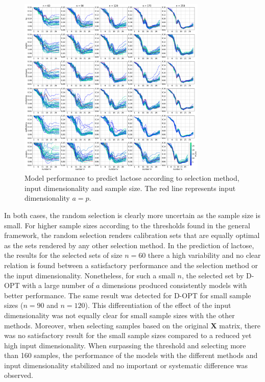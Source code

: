 \documentclass[journal=ancham,manuscript=article]{achemso}
\begin{document}
\begin{figure}[b]
\includegraphics[width=0.8\textwidth]{manuscript/figures/d01_milk_model_performance.png}
\centering
\caption{Model performance to predict lactose according to selection method, input dimensionality and sample size. The red line represents input dimensionality $a=p$.}
\label{fig_d01_milk_model_performance}
\end{figure}

In both cases, the random selection is clearly more uncertain as the sample size is small. For higher sample sizes according to the thresholds found in the general framework, the random selection renders calibration sets that are equally optimal as the sets rendered by any other selection method. In the prediction of lactose, the results for the selected sets of size $n=60$ there a high variability and no clear relation is found between a satisfactory performance and the selection method or the input dimensionality. Nonetheless, for such a small $n$, the selected set by D-OPT with a large number of $a$ dimensions produced consistently models with better performance. The same result was detected for D-OPT for small sample sizes ($n=90$ and $n=120$). This differentiation of the effect of the input dimensionality was not equally clear for small sample sizes with the other methods. Moreover, when selecting samples based on the original $\mathbf{X}$ matrix, there was no satisfactory result for the small sample sizes compared to a reduced yet high input dimensionality. When surpassing the threshold and selecting more than 160 samples, the performance of the models with the different methods and input dimensionality stabilized and no important or systematic difference was observed.
\end{document}
